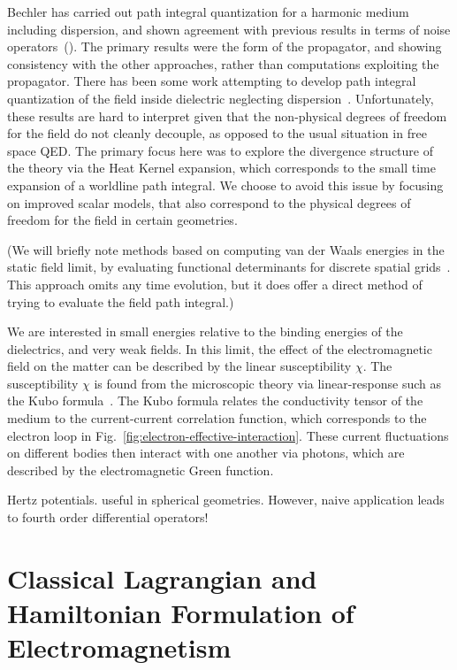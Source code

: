 Bechler has carried out path integral quantization for a harmonic medium 
including dispersion, and shown agreement with previous results in terms 
of noise operators~(\cite{Bechler1999}).  
The primary results were the form of the propagator, and showing consistency with the 
other approaches, rather than computations exploiting the propagator.
 There has been some work attempting to develop path integral quantization of
 the field inside dielectric neglecting dispersion~\cite{Bordag1998}.
  Unfortunately, these results are hard to interpret given that the non-physical
 degrees of freedom for the field do not cleanly decouple, as opposed to the 
usual situation in free space QED.
  The primary focus here was to explore the divergence structure of the theory
 via the Heat Kernel expansion, which corresponds to the small time expansion
 of a worldline path integral.
 We choose to avoid this issue by focusing on improved scalar models, 
that also correspond to the physical degrees of freedom for the field in certain geometries.  

(We will briefly note methods based on computing van der Waals energies in the static field limit,
by evaluating functional determinants for discrete spatial grids~\cite{Maggs2006,Pasquali2008}. This approach 
omits any time evolution, but it does offer a direct method of trying to evaluate the field path integral.)

We are interested in small energies relative to the binding energies of the dielectrics, and very weak
fields.  In this limit, the effect of the electromagnetic field on the matter can be described 
 by the linear susceptibility $\chi$.  The susceptibility $\chi$
is found from the microscopic theory via linear-response such as the Kubo formula~\cite{Rahi2009,Altland2011}.
The Kubo formula relates the conductivity tensor of the medium to the current-current correlation function,
which corresponds to the electron loop in Fig.~\ref{fig:electron-effective-interaction}.
These current fluctuations on different bodies then interact with one another via photons, which are 
described by the electromagnetic Green function.  

Hertz potentials.  useful in spherical geometries.  
However, naive application leads to fourth order differential operators!

\section{Classical Lagrangian and Hamiltonian Formulation of Electromagnetism}

